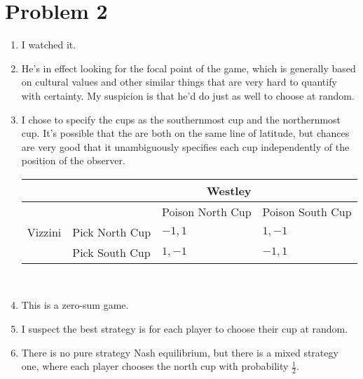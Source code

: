 \documentclass[letterpaper]{article}
\begin{document}
\section{Problem 2}
\begin{enumerate}
    \item I watched it.
    \item He's in effect looking for the focal point of the game, which is generally based on cultural values and other similar things that are very hard to quantify with certainty. My suspicion is that he'd do just as well to choose at random. 
    \item I chose to specify the cups as the southernmost cup and the northernmost cup. It's possible that the are both on the same line of latitude, but chances are very good that it unambiguously specifies each cup independently of the position of the observer. \\
        \begin{tabular}{|l|l|l|l|}
            \multicolumn{3}{r}{Westley}                      \\ \hline
            \multirow{3}{*}{Vizzini} &   & Poison North Cup        & Poison South Cup        \\ \hline
            & Pick North Cup & $-1,1$ & $1, -1$ \\ \hline
            & Pick South Cup & $1, -1$ & $-1,1$ \\ \hline
        \end{tabular} \\
    \item This is a zero-sum game.
    \item I suspect the best strategy is for each player to choose their cup at random.
    \item There is no pure strategy Nash equilibrium, but there is a mixed strategy one, where each player chooses the north cup with probability $\frac{1}{2}$.
\end{enumerate}
\end{document}
